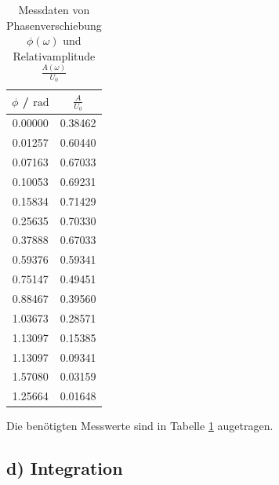 \begin{table}
	\caption{Messdaten von Phasenverschiebung $\phi(\omega)$ und Relativamplitude $\frac{A(\omega)}{U_0}$}
	\centering
	\label{tab:polars}
	\begin{tabular}{cc}
		\toprule
		$\phi$ / $\si{\radian}$ & $\frac{A}{U_0}$ \\
		\midrule
		0.00000                 & 0.38462         \\
		0.01257                 & 0.60440         \\
		0.07163                 & 0.67033         \\
		0.10053                 & 0.69231         \\
		0.15834                 & 0.71429         \\
		0.25635                 & 0.70330         \\
		0.37888                 & 0.67033         \\
		0.59376                 & 0.59341         \\
		0.75147                 & 0.49451         \\
		0.88467                 & 0.39560         \\
		1.03673                 & 0.28571         \\
		1.13097                 & 0.15385         \\
		1.13097                 & 0.09341         \\
		1.57080                 & 0.03159         \\
		1.25664                 & 0.01648         \\
		\bottomrule
	\end{tabular}
\end{table}

Die benötigten Messwerte sind in Tabelle \ref{tab:polars} augetragen.
\subsection{d) Integration}


